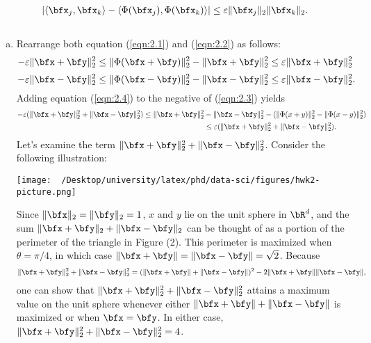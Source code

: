 \begin{homework}[e]
\begin{enumerate}[(a)]
      \begin{align*}
        |\langle \bfx_j,\bfx_k \rangle - \langle \Phi(\bfx_j),\Phi(\bfx_k) \rangle| \leq \epsilon \|\bfx_j\|_2\|\bfx_k\|_2.
      \end{align*}
  \end{enumerate}
  \begin{prf}$ $
    \begin{enumerate}[(a)]
      \item Rearrange both equation (\ref{eqn:2.1}) and (\ref{eqn:2.2}) as follows:
        \begin{equation}\label{eqn:2.3}
          -\epsilon\|\bfx +\bfy\|_2^2 \leq \|\Phi(\bfx + \bfy)\|_2^2 - \|\bfx + \bfy\|_2^2 \leq \epsilon\|\bfx + \bfy\|^2_2
        \end{equation}
        \begin{equation}\label{eqn:2.4}
          -\epsilon\|\bfx -\bfy\|_2^2 \leq \|\Phi(\bfx - \bfy)\|_2^2 - \|\bfx - \bfy\|_2^2 \leq \epsilon\|\bfx - \bfy\|^2_2.
        \end{equation}
        Adding equation (\ref{eqn:2.4}) to the negative of (\ref{eqn:2.3}) yields
        \begin{align*} 
          -\epsilon(\|\bfx + \bfy\|^2_2 + \|\bfx - \bfy\|^2_2) \leq \|\bfx + \bfy\|^2_2 &- \|\bfx - \bfy\|_2^2 - (\|\Phi(x + y)\|^2_2 - \|\Phi(x - y)\|^2_2)\\
          &\leq \epsilon(\|\bfx + \bfy\|^2_2 + \|\bfx - \bfy\|^2_2).
        \end{align*}
        Let's examine the term $\|\bfx + \bfy\|^2_2 + \|\bfx - \bfy\|^2_2$. Consider the following illustration:
        \begin{center}
          \texttt{[image: ~/Desktop/university/latex/phd/data-sci/figures/hwk2-picture.png]}
          \label{fig:prob2a}
        \end{center}
        Since $\|\bfx\|_2 = \|\bfy\|_2 = 1$, $x$ and $y$ lie on the unit sphere in $\bR^d$, and the sum $\|\bfx + \bfy\|_2 + \|\bfx - \bfy\|_2$ can be thought of as a portion of the perimeter of the triangle in Figure (2). This perimeter is maximized when $\theta = \pi/4$, in which case $\|\bfx+\bfy\| = \|\bfx - \bfy\| = \sqrt{2}$. Because
        \begin{align*}
          \|\bfx + \bfy\|^2_2 + \|\bfx - \bfy\|^2_2 = (\|\bfx + \bfy\| + \|\bfx - \bfy\|)^2 - 2\|\bfx + \bfy\|\|\bfx - \bfy\|,
        \end{align*}
        one can show that $\|\bfx + \bfy\|^2_2 + \|\bfx - \bfy\|^2_2$ attains a maximum value on the unit sphere whenever either $\|\bfx + \bfy\| + \|\bfx - \bfy\|$ is maximized or when $\bfx = \bfy$. In either case, $\|\bfx + \bfy\|^2_2 + \|\bfx - \bfy\|^2_2 = 4$.


\end{enumerate}
\end{prf}
\end{homework}
